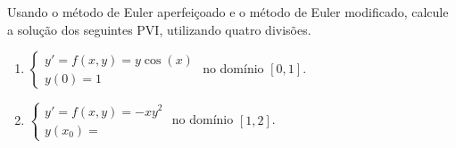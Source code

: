 \begin{ex}Usando o método de Euler aperfeiçoado e o método de Euler modificado, calcule a solução dos seguintes PVI, utilizando quatro divisões.
\begin{enumerate}
\item $\begin{cases}
y'=f(x,y)=y\cos(x)\\
y(0)=1
\end{cases}$ no domínio $[0,1].$
\item $\begin{cases}y'=f(x,y)=-xy^2\\y(x_0)=
\end{cases}$ no domínio $[1,2]$.
\end{enumerate}

\end{ex}